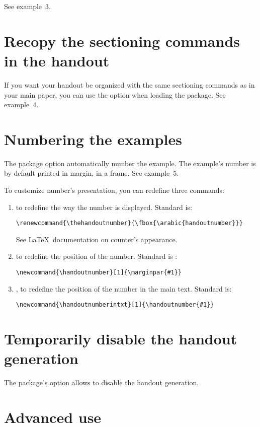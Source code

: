 \documentclass{ltxdockit}[2011/03/25]
\begin{document}
See example~3.

\section{Recopy the sectioning commands in the handout}

If you want your handout be organized with the same sectioning commands as in your main paper, you can use the option  when loading the package. See example~4.

\section{Numbering the examples}

The package option  automatically number the example. The example's number is by default printed in margin, in a frame. See example~5. 

To customize number's presentation, you can redefine three commands:
\begin{enumerate}	
	\item {} to redefine the way the number is displayed. Standard is:
\begin{verbatim}
\renewcommand{\thehandoutnumber}{\fbox{\arabic{handoutnumber}}}
\end{verbatim}	
See \LaTeX\ documentation on counter's appearance. 
	\item {} to redefine the position of the number. Standard is :
\begin{verbatim}
\newcommand{\handoutnumber}[1]{\marginpar{#1}}
\end{verbatim}
	\item {}, to redefine the position of the number in the main text. Standard is:
\begin{verbatim}
\newcommand{\handoutnumberintxt}[1]{\handoutnumber{#1}}
\end{verbatim}
\end{enumerate}

\section{Temporarily disable the handout generation}

The package's option  allows to disable the handout generation. 

\section{Advanced use}
\end{document}
